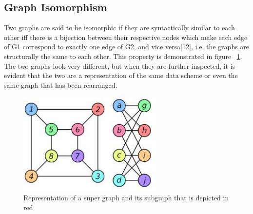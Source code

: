 \subsection{Graph Isomorphism}
Two graphs are said to be isomorphic if they are syntactically similar to each other iff there is a bijection between their respective nodes which make each edge of G1 correspond to exactly 
one edge of G2, and vice versa[12], i.e. the graphs are structurally the same to each other. This property is demonstrated in figure ~\ref{fig:isomorphism}. The two graphs look very different, but when they are further
inspected, it is evident that the two are a representation of the same data scheme or even the same graph that has been rearranged.
\begin{figure}[H]
  \begin{center}
      \includegraphics[width=0.65\textwidth]{isomorphism.png} 
  \end{center}     
  \caption{Representation of a super graph and its subgraph that is depicted in red}
  \label{fig:isomorphism}
\end{figure}
\newpage